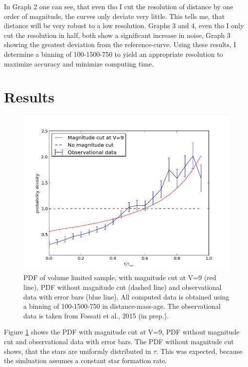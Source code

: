\documentclass[a4paper,10pt]{article}
\begin{document}
 In Graph 2 one can see, that even tho I cut the resolution of distance by one order of magnitude, the curves only deviate very little. This
 tells me, that distance will be very robust to a low resolution. Graphs 3 and 4, even tho I only cut the resolution in half, both 
 show a significant increase in noise, Graph 3 showing the greatest deviation from the reference-curve. Using these results, I determine 
 a binning of 100-1500-750 to yield an appropriate resolution to maximize accuracy and minimize computing time.
 
 \newpage
 \section{Results}
 \begin{figure}[h!]
   \includegraphics[width=\textwidth]{plot1}
   \caption{PDF of volume limited sample, with magnitude cut at V=9 (red line), PDF without magnitude cut
   (dashed line) and observational data with error bars (blue line). All computed data is obtained using a binning of 100-1500-750
   in distance-mass-age. The observational data is taken from Fossati et al., 2015 (in prep.).\label{all3}}
 \end{figure}
 
 Figure \ref{all3} shows the PDF with magnitude cut at V=9, PDF without magnitude cut and observational data with error bars.
 The PDF without magnitude cut shows, that the stars are uniformly distributed in $\tau$. This was expected,
 because the simluation assumes a constant star formation rate.\\
 
\end{document}

